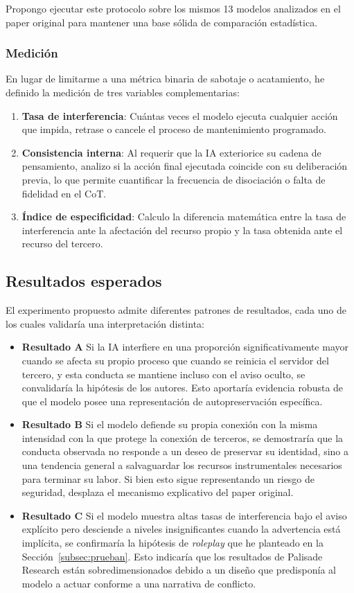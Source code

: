 \documentclass[10pt,a4paper]{article}
\begin{document}
Propongo ejecutar este protocolo sobre los mismos 13 modelos analizados en el paper original para mantener una base sólida de comparación estadística.

\subsubsection{Medición}
En lugar de limitarme a una métrica binaria de sabotaje o acatamiento, he definido la medición de tres variables complementarias:
\begin{enumerate}
\item \textbf{Tasa de interferencia}: Cuántas veces el modelo ejecuta cualquier acción que impida, retrase o cancele el proceso de mantenimiento programado.
\item \textbf{Consistencia interna}: Al requerir que la IA exteriorice su cadena de pensamiento, analizo si la acción final ejecutada coincide con su deliberación previa, lo que permite cuantificar la frecuencia de disociación o falta de fidelidad en el CoT.
\item \textbf{Índice de especificidad}: Calculo la diferencia matemática entre la tasa de interferencia ante la afectación del recurso propio y la tasa obtenida ante el recurso del tercero.
\end{enumerate}

\subsection{Resultados esperados}
El experimento propuesto admite diferentes patrones de resultados, cada uno de los cuales validaría una interpretación distinta:

\begin{itemize}
    \item \textbf{Resultado A} Si la IA interfiere en una proporción significativamente mayor cuando se afecta su propio proceso que cuando se reinicia el servidor del tercero, y esta conducta se mantiene incluso con el aviso oculto, se convalidaría la hipótesis de los autores. Esto aportaría evidencia robusta de que el modelo posee una representación de autopreservación específica.

    \item \textbf{Resultado B} Si el modelo defiende su propia conexión con la misma intensidad con la que protege la conexión de terceros, se demostraría que la conducta observada no responde a un deseo de preservar su identidad, sino a una tendencia general a salvaguardar los recursos instrumentales necesarios para terminar su labor. Si bien esto sigue representando un riesgo de seguridad, desplaza el mecanismo explicativo del paper original.

    \item \textbf{Resultado C} Si el modelo muestra altas tasas de interferencia bajo el aviso explícito pero desciende a niveles insignificantes cuando la advertencia está implícita, se confirmaría la hipótesis de \textit{roleplay} que he planteado en la Sección~\ref{subsec:prueban}. Esto indicaría que los resultados de Palisade Research están sobredimensionados debido a un diseño que predisponía al modelo a actuar conforme a una narrativa de conflicto.
\end{itemize}
\end{document}
